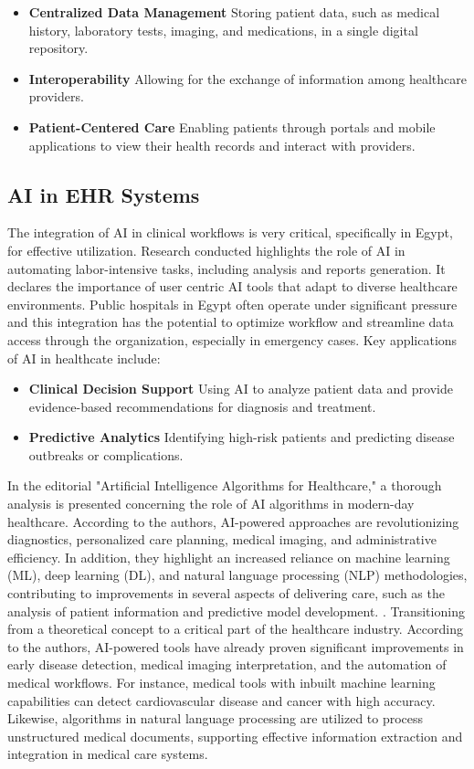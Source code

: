 \begin{itemize}
    \item \textbf{Centralized Data Management} Storing patient data, such as medical history, laboratory tests, imaging, and medications, in a single digital repository.
    \item \textbf{Interoperability} Allowing for the exchange of information among healthcare providers.
    \item \textbf{Patient-Centered Care} Enabling patients through portals and mobile applications to view their health records and interact with providers.
\end{itemize}
\subsection{AI in EHR Systems}
The integration of AI in clinical workflows is very critical, specifically in Egypt, for effective utilization. Research conducted highlights the role of AI in automating labor-intensive tasks, including analysis and reports generation. It declares the importance of user centric AI tools that adapt to diverse healthcare environments.\cite{article1} 
Public hospitals in Egypt often operate under significant pressure and this integration has the potential to optimize workflow and streamline data access through the organization, especially in emergency cases. Key applications of AI in healthcate include:
\begin{itemize}
    \item \textbf{Clinical Decision Support} Using AI to analyze patient data and provide evidence-based recommendations for diagnosis and treatment.
    \item \textbf{Predictive Analytics} Identifying high-risk patients and predicting disease outbreaks or complications.
\end{itemize}
In the editorial "Artificial Intelligence Algorithms for Healthcare," a thorough analysis is presented concerning the role of AI algorithms in modern-day healthcare. According to the authors, AI-powered approaches are revolutionizing diagnostics, personalized care planning, medical imaging, and administrative efficiency. In addition, they highlight an increased reliance on machine learning (ML), deep learning (DL), and natural language processing (NLP) methodologies, contributing to improvements in several aspects of delivering care, such as the analysis of patient information and predictive model development. \cite{Chumachenko2024}.
Transitioning from a theoretical concept to a critical part of the healthcare industry. According to the authors, AI-powered tools have already proven significant improvements in early disease detection, medical imaging interpretation, and the automation of medical workflows. For instance, medical tools with inbuilt machine learning capabilities can detect cardiovascular disease and cancer with high accuracy. Likewise, algorithms in natural language processing are utilized to process unstructured medical documents, supporting effective information extraction and integration in medical care systems.
